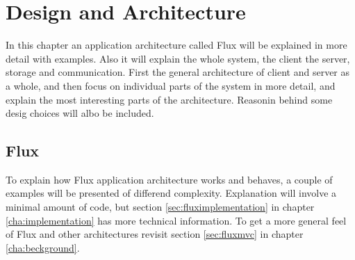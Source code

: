 \chapter{Design and Architecture}
In this chapter an application architecture called Flux will be explained in more detail with examples.  Also it will explain the whole system, the client the server, storage and communication. First the general architecture of client and server as a whole, and then focus on individual parts of the system in more detail, and explain the most interesting parts of the architecture. Reasonin behind some desig choices will albo be included.

\section{Flux}
To explain how Flux application architecture works and behaves, a couple of examples will be presented of differend complexity. Explanation will involve a minimal amount of code, but section \ref{sec:fluximplementation} in chapter \ref{cha:implementation} has more technical information. To get a more general feel of Flux and other architectures revisit section \ref{sec:fluxmvc} in chapter \ref{cha:beckground}.
